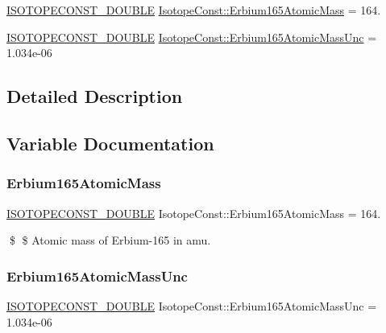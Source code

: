 \begin{DoxyCompactItemize}
\item 
\mbox{\hyperlink{group___isotope_const-_macros_ga8f45a7272ce02c0b4c65c44636ed719a}{I\+S\+O\+T\+O\+P\+E\+C\+O\+N\+S\+T\+\_\+\+D\+O\+U\+B\+LE}} \mbox{\hyperlink{group___isotope_const-_erbium-_er165_ga9f7e2236ca31d162382fe496a804ede7}{Isotope\+Const\+::\+Erbium165\+Atomic\+Mass}} = 164.
\item 
\mbox{\hyperlink{group___isotope_const-_macros_ga8f45a7272ce02c0b4c65c44636ed719a}{I\+S\+O\+T\+O\+P\+E\+C\+O\+N\+S\+T\+\_\+\+D\+O\+U\+B\+LE}} \mbox{\hyperlink{group___isotope_const-_erbium-_er165_ga8da5896e16466e919ffb7dff782afc1f}{Isotope\+Const\+::\+Erbium165\+Atomic\+Mass\+Unc}} = 1.\+034e-\/06
\end{DoxyCompactItemize}


\subsection{Detailed Description}


\subsection{Variable Documentation}
\mbox{\label{group___isotope_const-_erbium-_er165_ga9f7e2236ca31d162382fe496a804ede7}} 
\subsubsection{\texorpdfstring{Erbium165\+Atomic\+Mass}{Erbium165AtomicMass}}
{\footnotesize\ttfamily \mbox{\hyperlink{group___isotope_const-_macros_ga8f45a7272ce02c0b4c65c44636ed719a}{I\+S\+O\+T\+O\+P\+E\+C\+O\+N\+S\+T\+\_\+\+D\+O\+U\+B\+LE}} Isotope\+Const\+::\+Erbium165\+Atomic\+Mass = 164.}

\$ \$ Atomic mass of Erbium-\/165 in amu. \mbox{\label{group___isotope_const-_erbium-_er165_ga8da5896e16466e919ffb7dff782afc1f}} 
\subsubsection{\texorpdfstring{Erbium165\+Atomic\+Mass\+Unc}{Erbium165AtomicMassUnc}}
{\footnotesize\ttfamily \mbox{\hyperlink{group___isotope_const-_macros_ga8f45a7272ce02c0b4c65c44636ed719a}{I\+S\+O\+T\+O\+P\+E\+C\+O\+N\+S\+T\+\_\+\+D\+O\+U\+B\+LE}} Isotope\+Const\+::\+Erbium165\+Atomic\+Mass\+Unc = 1.\+034e-\/06}

